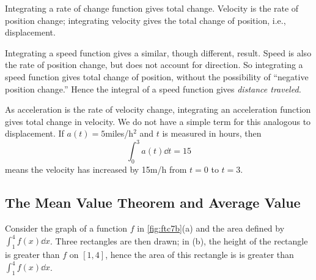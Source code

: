 Integrating a rate of change function gives total change. Velocity is the rate of position change; integrating velocity gives the total change of position, i.e., displacement.

Integrating a speed function gives a similar, though different, result. Speed is also the rate of position change, but does not account for direction. So integrating a speed function gives total change of position, without the possibility of ``negative position change.'' Hence the integral of a speed function gives \emph{distance traveled.}


As acceleration is the rate of velocity change, integrating an acceleration function gives total change in velocity. We do not have a simple term for this analogous to displacement. If $a(t) = 5$miles/h$^2$ and $t$ is measured in hours, then 
\[\int_0^3 a(t)\dd t = 15\]
means the velocity has increased by 15m/h from $t=0$ to $t=3$.

\subsection{The Mean Value Theorem and Average Value}

Consider the graph of a function $f$ in \autoref{fig:ftc7b}(a) and the area defined by $\int_1^4 f(x)\dd x$. Three rectangles are then drawn; in (b), the height of the rectangle is greater than $f$ on $[1,4]$, hence the area of this rectangle is is greater than $\int_1^4 f(x)\dd x$.

